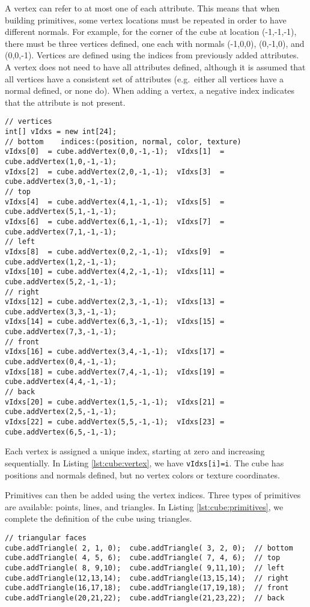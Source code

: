 \documentclass{article}
\begin{document}
A vertex can refer to at most one of each attribute.  This means that when building 
primitives, some vertex locations must be repeated in order to have different normals.
For example, for the corner of the cube at location (-1,-1,-1), there must be three
vertices defined, one each with normals (-1,0,0), (0,-1,0), and (0,0,-1).  Vertices
are defined using the indices from previously added attributes.  A vertex does not need
to have all attributes defined, although it is assumed that all vertices have a consistent
set of attributes (e.g.~either all vertices have a normal defined, or none do).  When 
adding a vertex, a negative index indicates that the
 attribute is not present.
\begin{lstlisting}[caption=Adding vertices to the cube,label=lst:cube:vertex]
// vertices
int[] vIdxs = new int[24];
// bottom    indices:(position, normal, color, texture)
vIdxs[0]  = cube.addVertex(0,0,-1,-1);  vIdxs[1]  = cube.addVertex(1,0,-1,-1);
vIdxs[2]  = cube.addVertex(2,0,-1,-1);  vIdxs[3]  = cube.addVertex(3,0,-1,-1);
// top
vIdxs[4]  = cube.addVertex(4,1,-1,-1);  vIdxs[5]  = cube.addVertex(5,1,-1,-1);
vIdxs[6]  = cube.addVertex(6,1,-1,-1);  vIdxs[7]  = cube.addVertex(7,1,-1,-1);
// left
vIdxs[8]  = cube.addVertex(0,2,-1,-1);  vIdxs[9]  = cube.addVertex(1,2,-1,-1);
vIdxs[10] = cube.addVertex(4,2,-1,-1);  vIdxs[11] = cube.addVertex(5,2,-1,-1);
// right
vIdxs[12] = cube.addVertex(2,3,-1,-1);  vIdxs[13] = cube.addVertex(3,3,-1,-1);
vIdxs[14] = cube.addVertex(6,3,-1,-1);  vIdxs[15] = cube.addVertex(7,3,-1,-1);
// front
vIdxs[16] = cube.addVertex(3,4,-1,-1);  vIdxs[17] = cube.addVertex(0,4,-1,-1);
vIdxs[18] = cube.addVertex(7,4,-1,-1);  vIdxs[19] = cube.addVertex(4,4,-1,-1);
// back
vIdxs[20] = cube.addVertex(1,5,-1,-1);  vIdxs[21] = cube.addVertex(2,5,-1,-1);
vIdxs[22] = cube.addVertex(5,5,-1,-1);  vIdxs[23] = cube.addVertex(6,5,-1,-1);
\end{lstlisting}
Each vertex is assigned a unique index, starting at zero and increasing sequentially.  In Listing
\ref{lst:cube:vertex}, we have \lstinline{vIdxs[i]=i}.  The cube has positions and normals
defined, but no vertex colors or texture coordinates.

Primitives can then be added using the vertex indices.  Three types of primitives are
available: points, lines, and triangles.  In Listing \ref{lst:cube:primitives}, we complete
the definition of the cube using triangles.
\begin{lstlisting}[caption={Adding triangle primitives to complete the cube}, label=lst:cube:primitives]
// triangular faces
cube.addTriangle( 2, 1, 0);  cube.addTriangle( 3, 2, 0);  // bottom
cube.addTriangle( 4, 5, 6);  cube.addTriangle( 7, 4, 6);  // top
cube.addTriangle( 8, 9,10);  cube.addTriangle( 9,11,10);  // left
cube.addTriangle(12,13,14);  cube.addTriangle(13,15,14);  // right
cube.addTriangle(16,17,18);  cube.addTriangle(17,19,18);  // front
cube.addTriangle(20,21,22);  cube.addTriangle(21,23,22);  // back
\end{lstlisting}
\end{document}
